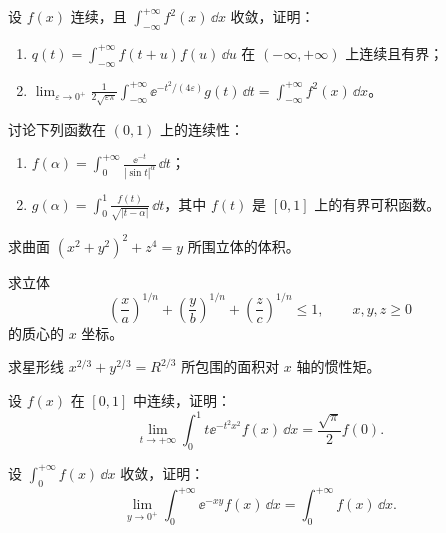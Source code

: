 \begin{xreferenceproblem}[6]
设 $f(x)$ 连续，且 $\displaystyle\int_{-\infty}^{+\infty}f^2(x)\,\dd x$ 收敛，证明：
  \begin{enumerate}[label=(\arabic*)]
    \item $q(t)=\displaystyle\int_{-\infty}^{+\infty}f(t+u)f(u)\,\dd u$ 在 $(-\infty,+\infty)$ 上连续且有界；
    \item $\displaystyle\lim_{\varepsilon\to0^+}\frac1{2\sqrt{\varepsilon\pi}}\int_{-\infty}^{+\infty}\ee^{-t^2/(4\varepsilon)}g(t)\,\dd t=\int_{-\infty}^{+\infty}f^2(x)\,\dd x$。
  \end{enumerate}
\end{xreferenceproblem}

\begin{xreferenceproblem}[7]
讨论下列函数在 $(0,1)$ 上的连续性：
  \begin{enumerate}[label=(\arabic*)]
    \item $f(\alpha)=\displaystyle\int_0^{+\infty}\frac{\ee^{-t}}{|\sin t|^\alpha}\,\dd t$；
    \item $g(\alpha)=\displaystyle\int_0^1\frac{f(t)}{\sqrt{|t-\alpha|}}\,\dd t$，其中 $f(t)$ 是 $[0,1]$ 上的有界可积函数。
  \end{enumerate}
\end{xreferenceproblem}

\begin{xreferenceproblem}[8]
求曲面 $(x^2+y^2)^2+z^4=y$ 所围立体的体积。
\end{xreferenceproblem}

\begin{xreferenceproblem}[9]
求立体
  \[
    \left(\frac xa\right)^{1/n}+\left(\frac yb\right)^{1/n}+\left(\frac zc\right)^{1/n}\leqslant1,
    \qquad x,y,z\geqslant0
  \]
  的质心的 $x$ 坐标。
\end{xreferenceproblem}

\begin{xreferenceproblem}[10]
求星形线 $x^{2/3}+y^{2/3}=R^{2/3}$ 所包围的面积对 $x$ 轴的惯性矩。
\end{xreferenceproblem}

\begin{xreferenceproblem}[11]
设 $f(x)$ 在 $[0,1]$ 中连续，证明：
  \[
    \lim_{t\to+\infty}\int_0^1t\ee^{-t^2x^2}f(x)\,\dd x=\frac{\sqrt\pi}{2}f(0).
  \]
\end{xreferenceproblem}

\begin{xreferenceproblem}[12]
设 $\displaystyle\int_0^{+\infty}f(x)\,\dd x$ 收敛，证明：
  \[
    \lim_{y\to0^+}\int_0^{+\infty}\ee^{-xy}f(x)\,\dd x=\int_0^{+\infty}f(x)\,\dd x.
  \]
\end{xreferenceproblem}

